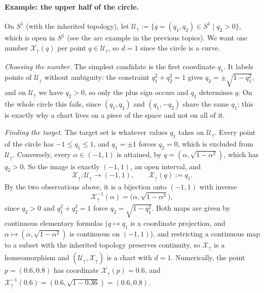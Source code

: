 \documentclass[11pt]{article}
\begin{document}
\paragraph{Example: the upper half of the circle.} On $S^1$ (with the inherited topology), let $\mathcal U_\uparrow:=\{q=(q_1,q_2)\in S^1\mid q_2>0\}$, which is open in $S^1$ (see the arc example in the previous topics). We want one number $\mathcal X_\uparrow(q)$ per point $q\in\mathcal U_\uparrow$, so $d=1$ since the circle is a curve.

\emph{Choosing the number.} The simplest candidate is the first coordinate $q_1$. It labels points of $\mathcal U_\uparrow$ without ambiguity: the constraint $q_1^2+q_2^2=1$ gives $q_2=\pm\sqrt{1-q_1^2}$, and on $\mathcal U_\uparrow$ we have $q_2>0$, so only the plus sign occurs and $q_1$ determines $q$. On the whole circle this fails, since $(q_1,q_2)$ and $(q_1,-q_2)$ share the same $q_1$; this is exactly why a chart lives on a piece of the space and not on all of it.

\emph{Finding the target.} The target set is whatever values $q_1$ takes on $\mathcal U_\uparrow$. Every point of the circle has $-1\le q_1\le1$, and $q_1=\pm1$ forces $q_2=0$, which is excluded from $\mathcal U_\uparrow$. Conversely, every $\alpha\in(-1,1)$ is attained, by $q=(\alpha,\sqrt{1-\alpha^2})$, which has $q_2>0$. So the image is exactly $(-1,1)$, an open interval, and
\[
\mathcal X_\uparrow:\mathcal U_\uparrow\to(-1,1),\qquad\mathcal X_\uparrow(q):=q_1.
\]
By the two observations above, it is a bijection onto $(-1,1)$ with inverse
\[
\mathcal X_\uparrow^{-1}(\alpha)=\big(\alpha,\sqrt{1-\alpha^2}\big),
\]
since $q_2>0$ and $q_1^2+q_2^2=1$ force $q_2=\sqrt{1-q_1^2}$. Both maps are given by continuous elementary formulas ($q\mapsto q_1$ is a coordinate projection, and $\alpha\mapsto(\alpha,\sqrt{1-\alpha^2})$ is continuous on $(-1,1)$), and restricting a continuous map to a subset with the inherited topology preserves continuity, so $\mathcal X_\uparrow$ is a homeomorphism and $(\mathcal U_\uparrow,\mathcal X_\uparrow)$ is a chart with $d=1$. Numerically, the point $p=(0.6,0.8)$ has coordinate $\mathcal X_\uparrow(p)=0.6$, and $\mathcal X_\uparrow^{-1}(0.6)=(0.6,\sqrt{1-0.36})=(0.6,0.8)$.
\end{document}
